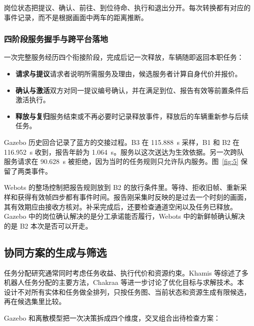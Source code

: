岗位状态把提议、确认、前往、到位待命、执行和退出分开。每次转换都有对应的事件记录，而不是根据画面中两车的距离推断。


\subsubsection*{四阶段服务握手与跨平台落地}

一次完整服务经历四个衔接阶段，完成后记一次释放，车辆随即返回本职任务：
\begin{itemize}
\item \textbf{请求与提议}\quad 请求者说明所需服务及理由，候选服务者计算自身代价并报价。
\item \textbf{确认与激活}\quad 双方对同一提议编号确认，并在满足到位、报告有效等前置条件后激活执行。
\item \textbf{释放与复归}\quad 服务结束或不再必要时记录释放事件，释放后的车辆重新参与后续任务。
\end{itemize}

Gazebo 历史回合记录了蓝方的交接过程。B3 在 115.888~s 采样，B1 和 B2 在 116.952~s 收到，报告年龄为 1.064~s。服务以这次送达为生效依据。另一次跨队服务请求在 90.628~s 被拒绝，因为当时的任务规则只允许队内服务。图~\ref{fig:5} 保留了两类事件。

Webots 的整场控制把报告规则放到 B2 的放行条件里。等待、拒收旧帧、重新采样和获得有效帧四步都有事件时间。报告刚采集时反映的是过去一个时刻的画面，其有效期应由接收方核对。补采完成后，还要检查通道空闲以及任务已释放。Gazebo 中的岗位确认解决的是分工承诺能否履行，Webots 中的新鲜帧确认解决的是 B2 本次是否可以开走。

\subsection{协同方案的生成与筛选}\label{sec:3.4}

任务分配研究通常同时考虑任务收益、执行代价和资源约束\cite{ref12}。Khamis 等综述了多机器人任务分配的主要方法\cite{ref13}，Chakraa 等进一步讨论了优化目标与求解技术\cite{ref14}。本设计不对所有实体和任务做全排列，只按任务图、当前状态和资源生成有限候选，再在候选集里比较。

Gazebo 和离散模型把一次决策拆成四个维度，交叉组合出待检查方案：

